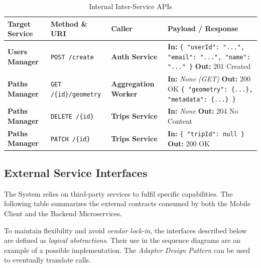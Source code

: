 \begin{table}[H]
\sf
\small
\centering
\renewcommand{\arraystretch}{1.5}
\begin{tabularx}{\textwidth}{|l|l|l|X|}
\hline
\rowcolor{lightgray} \textbf{Target Service} & \textbf{Method \& URI} & \textbf{Caller} & \textbf{Payload / Response} \\ \hline

\textbf{Users Manager} & \texttt{POST /create} & 
\textbf{Auth Service} & 
\textbf{In:} \texttt{\{ "userId": "...", \newline "email": "...", \newline "name": "..." \}} \newline
\textbf{Out:} 201 Created \\ \hline


\textbf{Paths Manager} & \texttt{GET /\{id\}/geometry} & 
\textbf{Aggregation Worker} & 
\textbf{In:} \textit{None (GET)} \newline
\textbf{Out:} 200 OK \newline \texttt{\{ "geometry": \{...\}, \newline "metadata": \{...\} \}} \\ \hline

\textbf{Paths Manager} & \texttt{DELETE /\{id\}} & 
\textbf{Trips Service} & 
\textbf{In:} \textit{None} \newline
\textbf{Out:} 204 No Content \\ \hline

\textbf{Paths Manager} & \texttt{PATCH /\{id\}} & 
\textbf{Trips Service} & 
\textbf{In:} \texttt{\{ "tripId": null \}} \newline
\textbf{Out:} 200 OK \\ \hline

\end{tabularx}
\caption{Internal Inter-Service APIs}
\label{tab:api_internal_services}
\end{table}

\subsection{External Service Interfaces}
\label{subsubsec:ESI}
The System relies on third-party services to fulfil specific capabilities. The following table summarizes the external contracts consumed by both the Mobile Client and the Backend Microservices.


To maintain flexibility and avoid \emph{vendor lock-in}, the interfaces described below are defined as \emph{logical abstractions}. Their use in the sequence diagrams are an example of a possible implementation. The \emph{Adapter Design Pattern} can be used to eventually translate calls.

